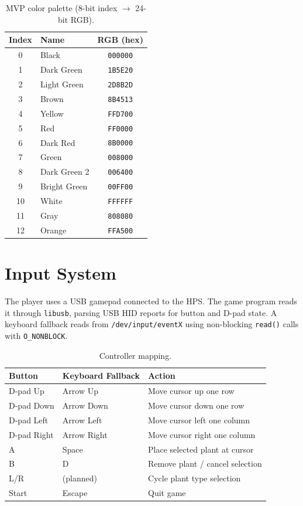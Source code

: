 \documentclass[11pt,letterpaper]{article}
\begin{document}
\begin{table}[H]
\centering
\caption{MVP color palette (8-bit index $\to$ 24-bit RGB).}
\label{tab:palette}
\begin{tabular}{c l c}
\toprule
\textbf{Index} & \textbf{Name} & \textbf{RGB (hex)} \\
\midrule
0  & Black        & \texttt{000000} \\
1  & Dark Green   & \texttt{1B5E20} \\
2  & Light Green  & \texttt{2D8B2D} \\
3  & Brown        & \texttt{8B4513} \\
4  & Yellow       & \texttt{FFD700} \\
5  & Red          & \texttt{FF0000} \\
6  & Dark Red     & \texttt{8B0000} \\
7  & Green        & \texttt{008000} \\
8  & Dark Green 2 & \texttt{006400} \\
9  & Bright Green & \texttt{00FF00} \\
10 & White        & \texttt{FFFFFF} \\
11 & Gray         & \texttt{808080} \\
12 & Orange       & \texttt{FFA500} \\
\bottomrule
\end{tabular}
\end{table}

\section{Input System}
\label{sec:input}

The player uses a USB gamepad connected to the HPS. The game program
reads it through \texttt{libusb}, parsing USB HID reports for button and
D-pad state. A keyboard fallback reads from \texttt{/dev/input/eventX}
using non-blocking \texttt{read()} calls with \texttt{O\_NONBLOCK}.

\begin{table}[H]
\centering
\caption{Controller mapping.}
\label{tab:controls}
\begin{tabular}{l l l}
\toprule
\textbf{Button} & \textbf{Keyboard Fallback} & \textbf{Action} \\
\midrule
D-pad Up    & Arrow Up    & Move cursor up one row \\
D-pad Down  & Arrow Down  & Move cursor down one row \\
D-pad Left  & Arrow Left  & Move cursor left one column \\
D-pad Right & Arrow Right & Move cursor right one column \\
A           & Space       & Place selected plant at cursor \\
B           & D           & Remove plant / cancel selection \\
L/R         & (planned)   & Cycle plant type selection \\
Start       & Escape      & Quit game \\
\bottomrule
\end{tabular}
\end{table}
\end{document}
